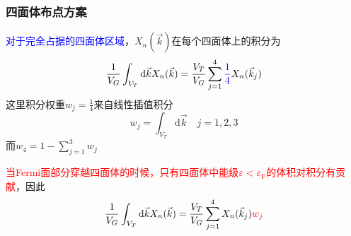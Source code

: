 \documentclass[cjk,slidestop,compress,mathserif,blue]{beamer}
\begin{document}
\frame
{
	\frametitle{四面体布点方案}
	\textcolor{blue}{对于完全占据的四面体区域}，$X_n(\vec k)$在每个四面体上的积分为
	\begin{displaymath}
		\dfrac1{V_G}\int_{V_T}\mathrm{d}\vec k X_n(\vec k)=\dfrac{V_T}{V_G}\sum_{j=1}^4\textcolor{blue}{\dfrac14}X_n(\vec k_j)
	\end{displaymath}
	这里积分权重$w_j=\frac14$来自线性插值积分
	$$w_j=\int_{V_T}\mathrm{d}\vec k\quad j=1,2,3$$
	而$w_4=1-\sum\limits_{j=1}^3w_j$

	\textcolor{red}{当\textrm{Fermi}面部分穿越四面体的时候，只有四面体中能级$\varepsilon<\varepsilon_{\mathrm{F}}$的体积对积分有贡献}，因此
	\begin{displaymath}
		\dfrac1{V_G}\int_{V_T}\mathrm{d}\vec k X_n(\vec k)=\dfrac{V_T}{V_G}\sum_{j=1}^4X_n(\vec k_j)\textcolor{red}{w_j}
	\end{displaymath}
}
\end{document}
